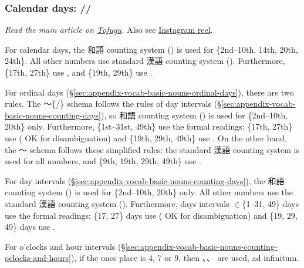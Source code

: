 \documentclass[../nihongo-gakushuu-kyouzai.tex]{subfiles}
\begin{document}
\subsubsection{Calendar days: //} \label{sec:appendix-vocab-basic-nouns-calendar-days}
\emph{Read the main article on \href{https://www.tofugu.com/japanese/japanese-counter-ka-nichi/}{Tofugu}.} Also see \href{https://www.instagram.com/reel/C_4iSZdyIPt/}{Instagram reel}.

\color{orange}
For calendar days, the 和語 counting system () is used for \{2nd--10th, 14th, 20th, 24th\}. All other numbers use standard 漢語 counting system (). Furthermore, \{17th, 27th\} use , and \{19th, 29th\} use .

For ordinal days (\S\ref{sec:appendix-vocab-basic-nouns-ordinal-days}), there are two rules. The 〜\{/\} schema follows the rules of day intervals (\S\ref{sec:appendix-vocab-basic-nouns-counting-days}), so 和語 counting system () is used for \{2nd--10th, 20th\} only. Furthermore, \{1st--31st, 49th\} use the formal readings: \{17th, 27th\} use  ( OK for disambiguation) and \{19th, 29th, 49th\} use . On the other hand, the 〜 schema follows these simplified rules: the standard 漢語 counting system is used for all numbers, and \{9th, 19th, 29th, 49th\} use .

For day intervals (\S\ref{sec:appendix-vocab-basic-nouns-counting-days}), the 和語 counting system () is used for \{2nd--10th, 20th\} only. All other numbers use the standard 漢語 counting system (). Furthermore, days intervals $\in$\{1--31, 49\} days use the formal readings: \{17, 27\} days use  ( OK for disambiguation) and \{19, 29, 49\} days use .

For o'clocks and hour intervals (\S\ref{sec:appendix-vocab-basic-nouns-counting-oclocks-and-hours}), if the ones place is 4, 7 or 9, then 、、 are used, ad infinitum.
\color{black}
\end{document}
